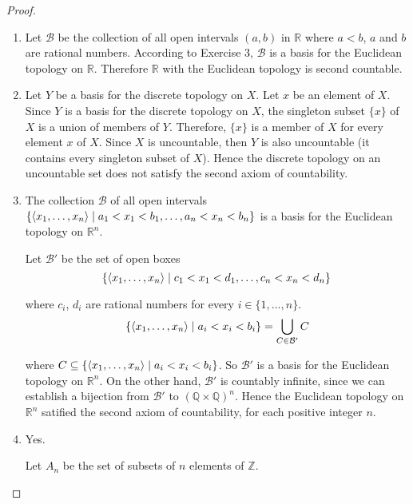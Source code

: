 \begin{proof}
	\begin{enumerate}[label={(\roman*)}]
		\item Let $\mathcal{B}$ be the collection of all open intervals $(a, b)$ in $\mathbb{R}$ where $a < b$, $a$ and $b$ are rational numbers. According to Exercise 3, $\mathcal{B}$ is a basis for the Euclidean topology on $\mathbb{R}$. Therefore $\mathbb{R}$ with the Euclidean topology is second countable.
		\item Let $Y$ be a basis for the discrete topology on $X$. Let $x$ be an element of $X$. Since $Y$ is a basis for the discrete topology on $X$, the singleton subset $\{ x \}$ of $X$ is a union of members of $Y$. Therefore, $\{ x \}$ is a member of $X$ for every element $x$ of $X$. Since $X$ is uncountable, then $Y$ is also uncountable (it contains every singleton subset of $X$). Hence the discrete topology on an uncountable set does not satisfy the second axiom of countability.
		\item The collection $\mathcal{B}$ of all open intervals $\{ \left\langle{x_{1}, \ldots, x_{n}}\right\rangle \mid a_{1} < x_{1} < b_{1}, \ldots, a_{n} < x_{n} < b_{n} \}$ is a basis for the Euclidean topology on $\mathbb{R}^{n}$.

		      Let $\mathcal{B'}$ be the set of open boxes
		      \[
			      \{ \left\langle{x_{1},\ldots, x_{n}}\right\rangle \mid c_{1} < x_{1} < d_{1}, \ldots, c_{n} < x_{n} < d_{n} \}
		      \]

		      where $c_{i}$, $d_{i}$ are rational numbers for every $i\in \{ 1, \ldots, n \}$.
		      \[
			      \{ \left\langle{x_{1},\ldots, x_{n}}\right\rangle \mid a_{i} < x_{i} < b_{i} \} = \bigcup_{C\in\mathcal{B'}} C
		      \]

		      where $C\subseteq \{ \left\langle{x_{1},\ldots, x_{n}}\right\rangle \mid a_{i} < x_{i} < b_{i} \} $. So $\mathcal{B'}$ is a basis for the Euclidean topology on $\mathbb{R}^{n}$. On the other hand, $\mathcal{B'}$ is countably infinite, since we can establish a bijection from $\mathcal{B'}$ to ${(\mathbb{Q}\times\mathbb{Q})}^{n}$. Hence the Euclidean topology on $\mathbb{R}^{n}$ satified the second axiom of countability, for each positive integer $n$.
		\item Yes.

		      Let $A_{n}$ be the set of subsets of $n$ elements of $\mathbb{Z}$.


\end{enumerate}
\end{proof}
